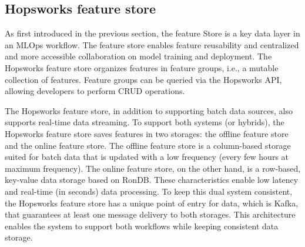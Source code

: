 \subsection{Hopsworks feature store}

As first introduced in the previous section, the feature Store is a key data layer in an \gls{MLOps} workflow. The feature store enables feature reusability and centralized and more accessible collaboration on model training and deployment. The Hopsworks feature store organizes features in feature groups, i.e., a mutable collection of features. Feature groups can be queried via the Hopsworks \gls{API}, allowing developers to perform \gls{CRUD} operations.

The Hopsworks feature store, in addition to supporting batch data sources, also supports real-time data streaming. To support both systems (or hybrids), the Hopsworks feature store saves features in two storages: the offline feature store and the online feature store. The offline feature store is a column-based storage suited for batch data that is updated with a low frequency (every few hours at maximum frequency). The online feature store, on the other hand, is a row-based, key-value data storage based on RonDB. These characteristics enable low latency and real-time (in seconds) data processing. To keep this dual system consistent, the Hopsworks feature store has a unique point of entry for data, which is Kafka, that guarantees at least one message delivery to both storages. This architecture enables the system to support both workflows while keeping consistent data storage.